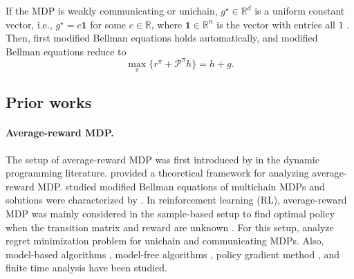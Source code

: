 \documentclass{article} %
\newcommand{\cP}{\mathcal{P}}
\newcommand{\real}{\mathbb{R}}
\begin{document}
If the MDP is weakly communicating or unichain, $g^\star\in \mathbb{R}^d$ is a uniform constant vector, i.e.,
$g^\star = c\mathbf{1}$ for some $c\in \mathbb{R}$, where $\mathbf{1}\in \mathbb{R}^n$ is the vector with entries all $1$ \cite[Theorem~8.3.2, ~8.4.1]{10.5555/528623}. Then, first modified Bellman equations holds automatically, and modified Bellman equations reduce to  
\[\max_{\pi }\{r^{\pi}+\cP^{\pi}h\}=h+g.\]

\subsection{Prior works}
\paragraph{Average-reward MDP.}
The setup of average-reward MDP was first introduced by \citet{howard1960dynamic} in the dynamic programming literature. \citet{blackwell1962discrete} provided a theoretical framework for analyzing average-reward MDP. \citet{yushkevich1974class, denardo1968multichain} studied modified Bellman equations of multichain MDPs and solutions were characterized by \citet{schweitzer1978functional, schweitzer1984existence}. In reinforcement learning (RL), average-reward MDP was mainly considered in the sample-based setup to find optimal policy when the transition matrix and reward are unknown \citep{dewanto2020average}. For this setup, \citet{burnetas1997optimal, Jaksch2010} analyze regret minimization problem for unichain and communicating MDPs. Also, model-based algorithms \citep{ zhang2019regret}, model-free algorithms \citep{wei2020model, wan2021learning}, policy gradient method \citep{kakade2001natural}, and finite time analysis \citep{zhang2021finite} have been studied. 
\end{document}
